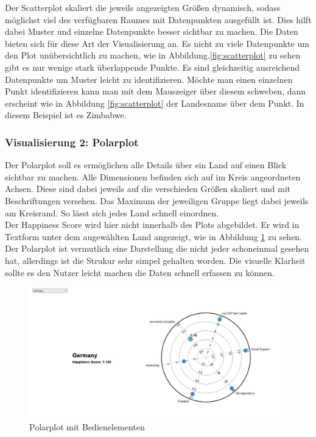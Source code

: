 Der Scatterplot skaliert die jeweils angezeigten Größen dynamisch, sodass möglichst viel des verfügbaren Raumes mit Datenpunkten ausgefüllt ist. Dies hilft dabei Muster und einzelne Datenpunkte besser sichtbar zu machen. Die Daten bieten sich für diese Art der Visualisierung an. Es nicht zu viele Datenpunkte um den Plot unübersichtlich zu machen, wie in Abbildung.\ref{fig:scatterplot} zu sehen gibt es nur wenige stark überlappende Punkte. Es sind gleichzeitig ausreichend Datenpunkte um Muster leicht zu identifizieren. Möchte man einen einzelnen Punkt identifizieren kann man mit dem Mauszeiger über diesem schweben, dann erscheint wie in Abbildung \ref{fig:scatterplot} der Landesname über dem Punkt. In diesem Beispiel ist es Zimbabwe. 


\subsubsection{Visualisierung 2: Polarplot}

Der Polarplot soll es ermöglichen alle Details über ein Land auf einen Blick sichtbar zu machen. Alle Dimensionen befinden sich auf im Kreis angeordneten Achsen. Diese sind dabei jeweils auf die verschieden Größen skaliert und mit Beschriftungen versehen. Das Maximum der jeweiligen Gruppe liegt dabei jeweils am Kreisrand. So lässt sich jedes Land schnell einordnen. \\

Der Happiness Score wird hier nicht innerhalb des Plots abgebildet. Er wird in Textform unter dem augewählten Land angezeigt, wie in Abbildung \ref{fig:polarplot} zu sehen. Der Polarplot ist vermutlich eine Darstellung die nicht jeder schoneinmal gesehen hat, allerdings ist die Strukur sehr simpel gehalten worden. Die visuelle Klarheit sollte es den Nutzer leicht machen die Daten schnell erfassen zu können. \\

\begin{figure}[h]
 \centering
 \includegraphics[width = \textwidth]{img/polarplot.jpg}
 \caption{Polarplot mit Bedienelementen}
 \label{fig:polarplot}
\end{figure}


